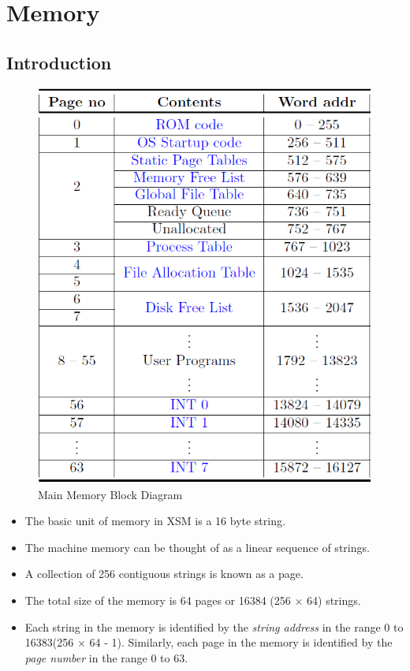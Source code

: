 \documentclass[11pt]{article}
\begin{document}
\section{Memory}

\subsection{Introduction}

\begin{figure}[hbtp]
\begin{center}
\includegraphics[scale=0.5]{memoryblockdiagram.png}
\end{center}
\caption{Main Memory Block Diagram}
\end{figure}

\begin{itemize}
\item The basic unit of memory in XSM is a 16 byte string.
\item The machine memory can be thought of as a linear sequence of strings.
\item A collection of 256 contiguous strings is known as a page.
\item The total size of the memory is 64 pages or 16384 (256 $\times$ 64) strings.
\item Each string in the memory is identified by the \textit{string address} in the range 0 to 16383(256 $\times$ 64 - 1). Similarly, each page in the memory is identified by the \textit{page number} in the range 0 to 63.
\end{itemize}
\end{document}
